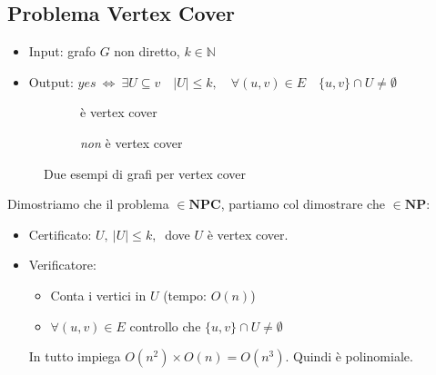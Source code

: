 \documentclass[a4paper]{article}
\theoremstyle{definition}
\newcommand{\N}{\mathbb{N}}
\newcommand{\np}{\mathbf{NP}}
\newcommand{\npc}{\mathbf{NPC}}
\begin{document}
	\subsection{Problema Vertex Cover}
		\begin{itemize}
			\item Input: grafo $ G $ non diretto, $ k \in \N $
			\item Output: $ yes\ \Leftrightarrow\ \exists U\subseteq v\quad \vert U\vert \leq k,\quad \forall(u,v)\in E\quad \{u, v\}\cap U \neq \emptyset $
		\end{itemize}
		\begin{figure}[h!]
			\begin{subfigure}{.5\textwidth}
				\centering
				\caption{è vertex cover}
			\end{subfigure}
			\begin{subfigure}{.5\textwidth}
				\centering
				\caption{\textit{non} è vertex cover}
			\end{subfigure}
			\caption{Due esempi di grafi per vertex cover}
		\end{figure}
		
		Dimostriamo che il problema $ \in \npc $, partiamo col dimostrare che $ \in \np $:		
		\begin{itemize}
			\item Certificato: $ U,\ \vert U\vert \leq k,\ $ dove $ U $ è vertex cover.
			\item Verificatore:
			\begin{itemize}
				\item Conta i vertici in $ U $ (tempo: $ O(n) $)
				\item $ \forall (u, v)\in E $ controllo che $ \{u, v\}\cap U\neq \emptyset $
			\end{itemize}
			In tutto impiega $ O(n^2)\times O(n) = O(n^3) $. Quindi è polinomiale.
		\end{itemize}
		 
\end{document}
